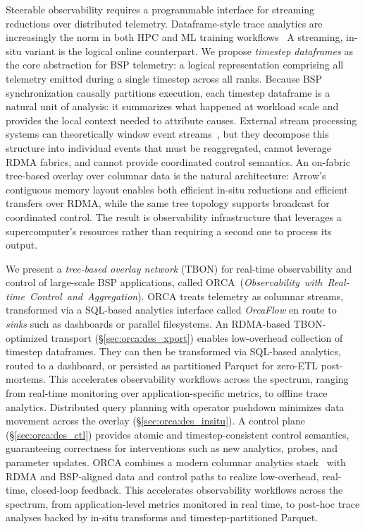 Steerable observability requires a programmable interface for streaming reductions over
distributed telemetry.
Dataframe-style trace analytics are increasingly the norm in both HPC and ML
training workflows~\cite{:HTA,Yildi2023:IOMax,Boehm2016:Caliper,Devar2024:DFTracer}
A streaming, in-situ variant is the logical online counterpart.
We propose \emph{timestep dataframes} as the core abstraction for BSP telemetry: a logical
representation comprising all telemetry emitted during a single timestep across all ranks.
Because BSP synchronization causally partitions execution, each timestep dataframe is a natural
unit of analysis: it summarizes what happened at workload scale and provides the local context
needed to attribute causes.
External stream processing systems can theoretically window event
streams~\cite{Kreps2011:Kafka,Carbo2015:ApacheFlink}, but they decompose this structure into
individual events that must be reaggregated, cannot leverage RDMA fabrics, and cannot provide
coordinated control semantics.
An on-fabric tree-based overlay over columnar data is the natural architecture: Arrow's contiguous
memory layout enables both efficient in-situ reductions and efficient transfers over RDMA, while
the same tree topology supports broadcast for coordinated control.
The result is observability infrastructure that leverages a supercomputer's resources
rather than requiring a second one to process its output.

We present a \emph{tree-based overlay network} (TBON) for real-time observability and control of
large-scale BSP applications, called
ORCA~(\emph{Observability~with~Real-time~Control~and~Aggregation}).
ORCA treats telemetry as columnar streams, transformed via a SQL-based analytics interface called
\emph{OrcaFlow} en route to \emph{sinks} such as dashboards or parallel filesystems.
An RDMA-based TBON-optimized transport (\S\ref{sec:orca:des_xport}) enables low-overhead collection
of timestep dataframes.
They can then be transformed via SQL-based analytics, routed to a dashboard, or persisted as
partitioned Parquet for zero-ETL post-mortems.
This accelerates observability workflows across the spectrum, ranging from real-time monitoring
over application-specific metrics, to offline trace analytics.
Distributed query planning with operator pushdown minimizes data movement across the overlay
(\S\ref{sec:orca:des_insitu}).
A control plane (\S\ref{sec:orca:des_ctl}) provides atomic and timestep-consistent control
semantics, guaranteeing correctness for interventions such as new analytics, probes, and parameter
updates.
ORCA combines a modern columnar analytics
stack~\cite{:ApacheArrow,:ApacheParquet,Lamb2024:DataFusion} with RDMA and BSP-aligned data and
control paths to realize low-overhead, real-time, closed-loop feedback.
This accelerates observability workflows across the spectrum, from application-level metrics
monitored in real time, to post-hoc trace analyses backed by in-situ transforms and
timestep-partitioned Parquet.

